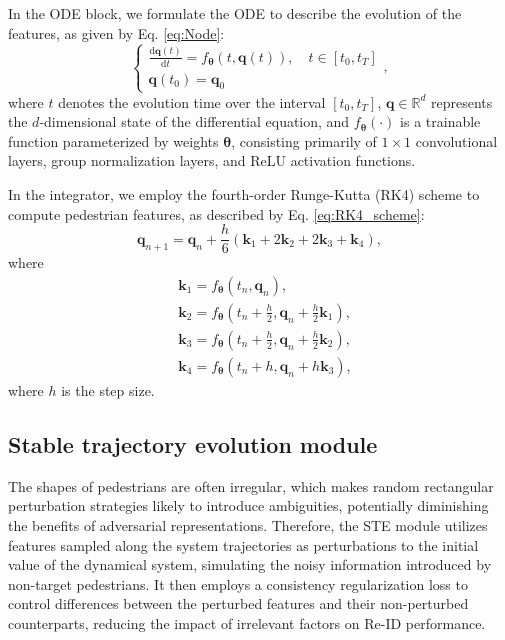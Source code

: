 \documentclass[12pt]{spieman}  %
\begin{document}
\begin{spacing}{2}
		In the ODE block, we formulate the ODE to describe the evolution of the features, as given by Eq. \eqref{eq:Node}:
		\begin{equation}
			\label{eq:Node}
			\left.\left\{\begin{array}{l}\frac{\mathrm{d}\boldsymbol{q}(t)}{\mathrm{d}t}=f_{\boldsymbol{\theta}}(t,\boldsymbol{q}(t)),\quad t\in[t_{0},t_{T}]\\\boldsymbol{q}(t_0)=\boldsymbol{q}_{0}\end{array}\right.\right.,
		\end{equation}
		where $t$ denotes the evolution time over the interval $[t_0, t_T]$, $\boldsymbol{q} \in \mathbb{R}^{d}$ represents the $d$-dimensional state of the differential equation, and $f_{\boldsymbol{\theta}}(\cdot)$ is a trainable function parameterized by weights $\boldsymbol{\theta}$, consisting primarily of $1\times1$ convolutional layers, group normalization layers, and ReLU activation functions.
		
		In the integrator, we employ the fourth-order Runge-Kutta (RK4) scheme to compute pedestrian features, as described by Eq. \eqref{eq:RK4_scheme}:
		\begin{equation}
			\label{eq:RK4_scheme}
			\boldsymbol q_{n+1}=\boldsymbol q_n+\frac{h}{6}\left(\boldsymbol k_1+2\boldsymbol k_2+2\boldsymbol k_3+\boldsymbol k_4\right),
		\end{equation}
		where
		\begin{equation}
			\begin{aligned}
				&\boldsymbol k_{1} =f_{\boldsymbol{\theta}} \left(t_n, \boldsymbol q_{n}\right), \\
				&\boldsymbol k_{2} =f_{\boldsymbol{\theta}} \left(t_n+\frac{h}{2}, \boldsymbol q_{n}+\frac{h}{2}\boldsymbol{k}_{1}\right), \\
				&\boldsymbol k_{3} =f_{\boldsymbol{\theta}} \left(t_n+\frac{h}{2}, \boldsymbol q_{n}+\frac{h}{2}\boldsymbol{k}_{2}\right), \\
				&\boldsymbol k_{4} =f_{\boldsymbol{\theta}} \left(t_n+h, \boldsymbol q_{n}+h\boldsymbol{k}_{3}\right),
			\end{aligned}
		\end{equation}
		where $h$ is the step size.
		
		\subsection{Stable trajectory evolution module}
		The shapes of pedestrians are often irregular, which makes random rectangular perturbation strategies likely to introduce ambiguities, potentially diminishing the benefits of adversarial representations. Therefore, the STE module utilizes features sampled along the system trajectories as perturbations to the initial value of the dynamical system, simulating the noisy information introduced by non-target pedestrians. It then employs a consistency regularization loss to control differences between the perturbed features and their non-perturbed counterparts, reducing the impact of irrelevant factors on Re-ID performance.
		

\end{spacing}
\end{document}
